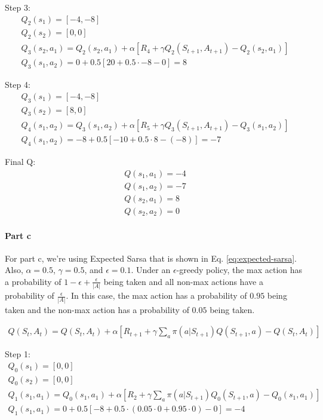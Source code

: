 \documentclass[12pt]{article}
\begin{document}
Step 3:
\begin{gather*}
  Q_2(s_1) = [-4, -8] \\
  Q_2(s_2) = [0, 0] \\
  Q_3(s_2, a_1) = Q_2(s_2, a_1) + \alpha [R_4 + \gamma Q_2(S_{t+1}, A_{t+1}) - Q_2(s_2, a_1)] \\
  Q_3(s_1, a_2) = 0 + 0.5 [20 + 0.5 \cdot -8 - 0] = 8
\end{gather*}

Step 4:
\begin{gather*}
  Q_3(s_1) = [-4, -8] \\
  Q_3(s_2) = [8, 0] \\
  Q_4(s_1, a_2) = Q_3(s_1, a_2) + \alpha [R_5 + \gamma Q_3(S_{t+1}, A_{t+1}) - Q_3(s_1, a_2)] \\
  Q_4(s_1, a_2) = -8 + 0.5 [-10 + 0.5 \cdot 8 - (-8)] = -7
\end{gather*}

Final Q:
\begin{gather*}
  Q(s_1, a_1) = -4 \\
  Q(s_1, a_2) = -7 \\
  Q(s_2, a_1) = 8 \\
  Q(s_2, a_2) = 0
\end{gather*}

\paragraph{Part c}

For part c, we're using Expected Sarsa that is shown in Eq. \ref{eq:expected-sarsa}. Also, $\alpha = 0.5$, $\gamma = 0.5$, and $\epsilon = 0.1$. Under an $\epsilon$-greedy policy, the max action has a probability of $1 - \epsilon + \frac{\epsilon}{|A|}$ being taken and all non-max actions have a probability of $\frac{\epsilon}{|A|}$. In this case, the max action has a probability of $0.95$ being taken and the non-max action has a probability of $0.05$ being taken.

\begin{gather}
  Q(S_t, A_t) = Q(S_t, A_t) + \alpha [R_{t+1} + \gamma \sum_{a} \pi(a|S_{t+1}) Q(S_{t+1}, a) - Q(S_t, A_t)] \label{eq:expected-sarsa}
\end{gather}

Step 1:
\begin{gather*}
  Q_0(s_1) = [0, 0] \\
  Q_0(s_2) = [0, 0] \\
  Q_1(s_1, a_1) = Q_0(s_1, a_1) + \alpha [R_2 + \gamma \sum_{a} \pi(a|S_{t+1}) Q_0(S_{t+1}, a) - Q_0(s_1, a_1)] \\
  Q_1(s_1, a_1) = 0 + 0.5 [-8 + 0.5 \cdot (0.05 \cdot 0 + 0.95 \cdot 0) - 0] = -4
\end{gather*}
\end{document}
